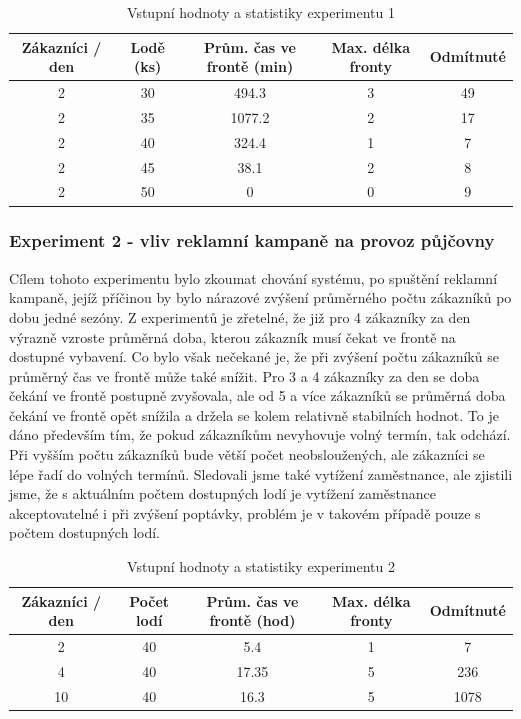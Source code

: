 \documentclass[a4paper, 12pt, hidelinks]{article}
\begin{document}
\begin{table}[h!]
    \centering
    \caption{Vstupní hodnoty a statistiky experimentu 1}
    \label{tab:simulation_stats1}
    \begin{tabular}{|c|c|c|c|c|}
        \hline
        \textbf{Zákazníci / den} & \textbf{Lodě (ks)} & \textbf{Prům. čas ve frontě (min)} & \textbf{Max. délka fronty} & \textbf{Odmítnuté}\\ \hline
        2 & 30 & 494.3 & 3 & 49 \\ \hline
        2 & 35 & 1077.2 & 2 & 17 \\ \hline
        2 & 40 & 324.4 & 1 & 7 \\ \hline
        2 & 45 & 38.1 & 2 & 8 \\ \hline
        2 & 50 & 0 & 0 & 9 \\ \hline
    \end{tabular}
\end{table}

\subsubsection{Experiment 2 - vliv reklamní kampaně na provoz půjčovny}
Cílem tohoto experimentu bylo zkoumat chování systému, po spuštění reklamní kampaně, jejíž příčinou by bylo nárazové zvýšení průměrného počtu zákazníků po dobu jedné sezóny. Z experimentů je zřetelné, že již pro 4 zákazníky za den výrazně vzroste průměrná doba, kterou zákazník musí čekat ve frontě na dostupné vybavení. Co bylo však nečekané je, že při zvýšení počtu zákazníků se průměrný čas ve frontě může také snížit. 
Pro 3 a 4 zákazníky za den se doba čekání ve frontě postupně zvyšovala, ale od 5 a více zákazníků se průměrná doba čekání ve frontě opět snížila a držela se kolem relativně stabilních hodnot. To je dáno především tím, že pokud zákazníkům nevyhovuje volný termín, tak odchází. Při vyšším počtu zákazníků bude větší počet neobsloužených, ale zákazníci se lépe řadí do volných termínů.
Sledovali jsme také vytížení zaměstnance, ale zjistili jsme, že s aktuálním počtem dostupných lodí je vytížení zaměstnance akceptovatelné i při zvýšení poptávky, problém je v takovém případě pouze s počtem dostupných lodí.
\begin{table}[h!]
    \centering
    \caption{Vstupní hodnoty a statistiky experimentu 2}
    \label{tab:simulation_stats2}
    \begin{tabular}{|c|c|c|c|c|}
        \hline
        \textbf{Zákazníci / den} & \textbf{Počet lodí} & \textbf{Prům. čas ve frontě (hod)} & \textbf{Max. délka fronty} & \textbf{Odmítnuté}\\ \hline
        2 & 40 & 5.4 & 1 & 7\\ \hline
        4 & 40 & 17.35 & 5 & 236\\ \hline
        10 & 40 & 16.3 & 5 & 1078\\ \hline
    \end{tabular}
\end{table}
\end{document}
